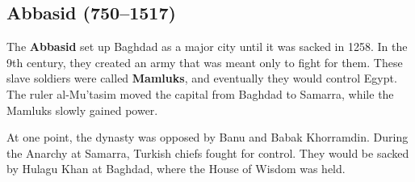 \subsection*{Abbasid (750--1517)}

The \textbf{Abbasid} set up Baghdad as a major city until it was sacked in 1258.
In the 9th century, they created an army that was meant only to fight for them.
These slave soldiers were called \textbf{Mamluks}, and eventually they would control Egypt.
The ruler al-Mu'tasim moved the capital from Baghdad to Samarra, while the Mamluks slowly gained power.

At one point, the dynasty was opposed by Banu and Babak Khorramdin.
During the Anarchy at Samarra, Turkish chiefs fought for control.
They would be sacked by Hulagu Khan at Baghdad, where the House of Wisdom was held.

